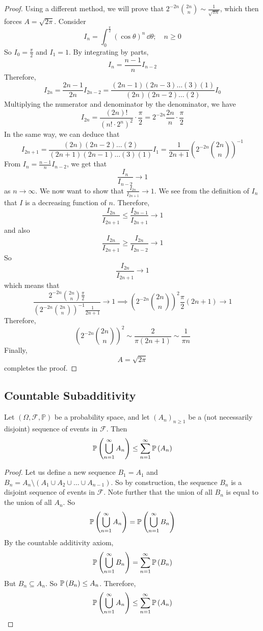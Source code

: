 \begin{proof}
	Using a different method, we will prove that \(2^{-2n} \binom{2n}{n} \sim \frac{1}{\sqrt{\pi n}}\), which then forces \(A = \sqrt{2\pi}\).
	Consider
	\[
		I_n = \int_0^{\frac{\pi}{2}} (\cos \theta)^n \, \dd \theta;\quad n \geq 0
	\]
	So \(I_0 = \frac{\pi}{2}\) and \(I_1 = 1\).
	By integrating by parts,
	\[
		I_n = \frac{n-1}{n}I_{n-2}
	\]
	Therefore,
	\[
		I_{2n} = \frac{2n-1}{2n}I_{2n-2} = \frac{(2n-1)(2n-3)\dots(3)(1)}{(2n)(2n-2)\dots(2)}I_0
	\]
	Multiplying the numerator and denominator by the denominator, we have
	\[
		I_{2n} = \frac{(2n)!}{(n! \cdot 2^n)^2} \cdot \frac{\pi}{2} = 2^{-2n} \frac{2n}{n} \cdot \frac{\pi}{2}
	\]
	In the same way, we can deduce that
	\[
		I_{2n+1} = \frac{(2n)(2n-2)\dots(2)}{(2n+1)(2n-1)\dots(3)(1)}I_1 = \frac{1}{2n+1} \left( 2^{-2n} \binom{2n}{n} \right)^{-1}
	\]
	From \(I_n = \frac{n-1}{n}I_{n-2}\), we get that
	\[
		\frac{I_n}{I_{n-2}} \to 1
	\]
	as \(n \to \infty\).
	We now want to show that \(\frac{I_{2n}}{I_{2n+1}} \to 1\).
	We see from the definition of \(I_n\) that \(I\) is a decreasing function of \(n\).
	Therefore,
	\[
		\frac{I_{2n}}{I_{2n+1}} \leq \frac{I_{2n-1}}{I_{2n+1}} \to 1
	\]
	and also
	\[
		\frac{I_{2n}}{I_{2n+1}} \geq \frac{I_{2n}}{I_{2n-2}} \to 1
	\]
	So
	\[
		\frac{I_{2n}}{I_{2n+1}} \to 1
	\]
	which means that
	\[
		\frac{2^{-2n} \binom{2n}{n} \frac{\pi}{2}}{\left( 2^{-2n} \binom{2n}{n} \right)^{-1} \frac{1}{2n+1}} \to 1 \implies \left( 2^{-2n} \binom{2n}{n} \right)^2 \frac{\pi}{2} (2n+1) \to 1
	\]
	Therefore,
	\[
		\left( 2^{-2n} \binom{2n}{n} \right)^2 \sim \frac{2}{\pi (2n+1)} \sim \frac{1}{\pi n}
	\]
	Finally,
	\[
		A = \sqrt{2 \pi}
	\]
	completes the proof.
\end{proof}

\subsection{Countable Subadditivity}
Let \((\Omega, \mathcal F, \mathbb P)\) be a probability space, and let \((A_n)_{n \geq 1}\) be a (not necessarily disjoint) sequence of events in \(\mathcal F\).
Then
\[
	\mathbb{P}\left({\bigcup_{n=1}^\infty A_n}\right) \leq \sum_{n=1}^\infty \mathbb{P}\left({A_n}\right)
\]
\begin{proof}
	Let us define a new sequence \(B_1 = A_1\) and \(B_n = A_n \setminus (A_1 \cup A_2 \cup \dots \cup A_{n-1})\).
	So by construction, the sequence \(B_n\) is a disjoint sequence of events in \(\mathcal F\).
	Note further that the union of all \(B_n\) is equal to the union of all \(A_n\).
	So
	\[
		\mathbb{P}\left({\bigcup_{n=1}^\infty A_n}\right) = \mathbb{P}\left({\bigcup_{n=1}^\infty B_n}\right)
	\]
	By the countable additivity axiom,
	\[
		\mathbb{P}\left({\bigcup_{n=1}^\infty B_n}\right) = \sum_{n=1}^\infty \mathbb{P}\left({B_n}\right)
	\]
	But \(B_n \subseteq A_n\).
	So \(\mathbb{P}\left({B_n}\right) \leq A_n\).
	Therefore,
	\[
		\mathbb{P}\left({\bigcup_{n=1}^\infty A_n}\right) \leq \sum_{n=1}^\infty \mathbb{P}\left({A_n}\right)
	\]
\end{proof}
